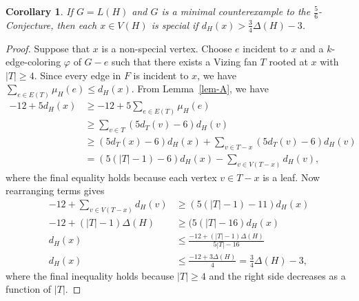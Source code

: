 \documentclass[12pt]{amsart}
\theoremstyle{plain}
\newtheorem{cor}[thm]{Corollary}
\theoremstyle{definition}
\theoremstyle{remark}
\newcommand{\vph}{\varphi}
\begin{document}
\begin{cor}
If $G=L(H)$ and $G$ is a minimal counterexample to the
$\frac56$-Conjecture, then each $x\in V(H)$ is special if $d_H(x) >
\frac34\Delta(H)-3$.  
\end{cor}
\begin{proof}
Suppose that $x$ is a non-special vertex.  Choose $e$ incident to $x$ and a
$k$-edge-coloring $\vph$ of $G-e$ such that there exists a Vizing fan $T$
rooted at $x$ with $|T|\ge 4$.  Since every edge in $F$ is incident to $x$, we
have $\sum_{e\in E(T)}\mu_H(e)\le d_H(x)$.
From Lemma~\ref{lem-A}, we have 
\begin{align*}
-12+5d_H(x) &\ge -12+5\sum_{e\in E(T)}\mu_H(e) \\
& \ge \sum_{v\in T}(5d_T(v)-6)d_H(v) \\
& \ge (5d_T(x)-6)d_H(x)+\sum_{v\in T-x}(5d_T(v)-6)d_H(v) \\
& = (5(|T|-1)-6)d_H(x)-\sum_{v\in V(T-x)}d_H(v),
\end{align*}
where the final equality holds because each vertex $v\in T-x$ is a leaf.
Now rearranging terms gives
\begin{align*}
-12 + \sum_{v\in V(T-x)}d_H(v) & \ge (5(|T|-1)-11)d_H(x)\\
-12 + (|T|-1)\Delta(H) & \ge (5(|T|-16)d_H(x)\\
d_H(x) & \le \frac{-12+(|T|-1)\Delta(H)}{5|T|-16}\\
d_H(x) & \le \frac{-12+3\Delta(H)}{4} = \frac34\Delta(H)-3,
\end{align*}
where the final inequality holds because $|T|\ge 4$ and the right side decreases
as a function of $|T|$.
\end{proof}
\end{document}

